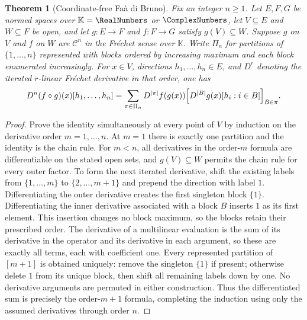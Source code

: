 \documentclass[11pt,a4paper,oneside,openany]{book}
\newtheorem{theorem}{Theorem}[chapter]
\theoremstyle{definition}
\theoremstyle{remark}
\begin{document}
\begin{theorem}[Coordinate-free Faà di Bruno]
\label{thm:merged-frechet-faa}
Fix an integer $n\geq1$.  Let $E,F,G$ be normed spaces over
$\mathbb K=\RealNumbers$ or $\ComplexNumbers$, let $V\subseteq E$ and
$W\subseteq F$ be open, and let $g:E\to F$ and $f:F\to G$ satisfy
$g(V)\subseteq W$.  Suppose $g$ on $V$ and $f$ on $W$ are
$\mathcal C^n$ in the Fréchet sense over $\mathbb K$.
Write $\Pi_n$ for partitions of $\{1,\ldots,n\}$ represented with blocks
ordered by increasing maximum and each block enumerated increasingly.
For $x\in V$, directions $h_1,\ldots,h_n\in E$, and $D^r$ denoting
the iterated $r$-linear Fréchet derivative in that order, one has
\begin{equation}
 D^n(f\circ g)(x)[h_1,\ldots,h_n]
 =\sum_{\pi\in\Pi_n}D^{|\pi|}f(g(x))
 \Bigl[D^{|B|}g(x)[h_i:i\in B]\Bigr]_{B\in\pi}.                   \label{eq:merged-frechet-faa}
\end{equation}
\end{theorem}

\begin{proof}
Prove the identity simultaneously at every point of $V$ by induction on
the derivative order $m=1,\ldots,n$.  At $m=1$ there is exactly one
partition and the identity is the chain rule.  For $m<n$, all derivatives
in the order-$m$ formula are differentiable on the stated open sets,
and $g(V)\subseteq W$ permits the chain rule for every outer factor.
To form the next iterated derivative, shift the existing labels from
$\{1,\ldots,m\}$ to $\{2,\ldots,m+1\}$ and prepend the direction
with label $1$.  Differentiating the outer derivative creates the first
singleton block $\{1\}$.  Differentiating the inner derivative associated
with a block $B$ inserts $1$ as its first element.  This insertion changes
no block maximum, so the blocks retain their prescribed order.
The derivative of a multilinear
evaluation is the sum of its derivative in the operator and its derivative
in each argument, so these are exactly all terms, each with coefficient one.
Every represented partition of $[m+1]$ is obtained uniquely: remove the
singleton $\{1\}$ if present; otherwise delete $1$ from its unique block,
then shift all remaining labels down by one.
No derivative arguments are permuted in either construction.
Thus the differentiated
sum is precisely the order-$m+1$ formula, completing the induction using
only the assumed derivatives through order $n$.
\end{proof}
\end{document}
